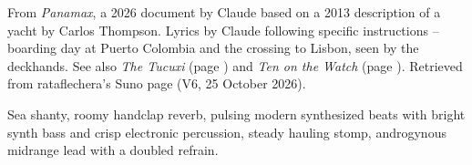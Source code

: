 
\label{sec:cast-off-from-puerto-colombia}
\begin{notes}
From \emph{Panamax}, a 2026 document by Claude based on a 2013 description of a yacht by Carlos Thompson. Lyrics by Claude following specific instructions -- boarding day at Puerto Colombia and the crossing to Lisbon, seen by the deckhands. See also \emph{The Tucuxi} (page \pageref{sec:the-tucuxi}) and \emph{Ten on the Watch} (page \pageref{sec:ten-on-the-watch}). Retrieved from rataflechera's Suno page (V6, 25 October 2026).
\end{notes}
\begin{style}
Sea shanty, roomy handclap reverb, pulsing modern synthesized beats with bright synth bass and crisp electronic percussion, steady hauling stomp, androgynous midrange lead with a doubled refrain.
\end{style}
